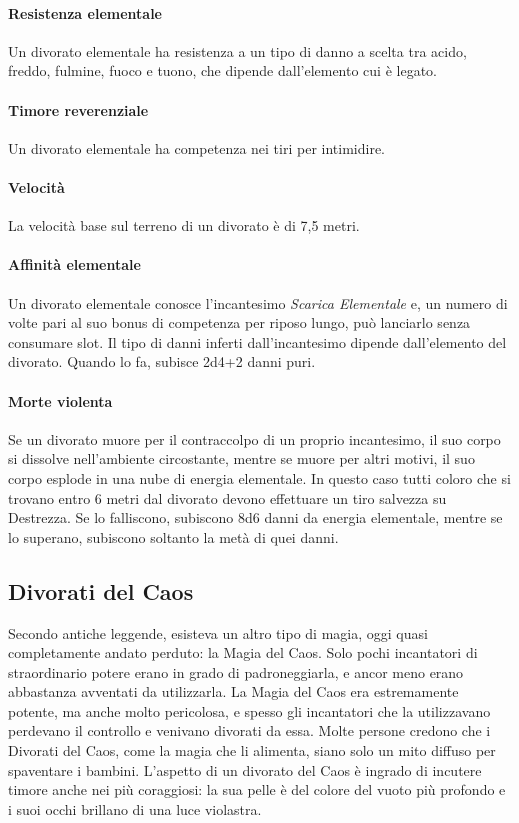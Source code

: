 \paragraph{Resistenza elementale} Un divorato elementale ha resistenza a un tipo di danno a scelta tra acido, freddo, fulmine, fuoco e tuono, che dipende dall'elemento cui è legato.
\paragraph{Timore reverenziale} Un divorato elementale ha competenza nei tiri per intimidire.
\paragraph{Velocità} La velocità base sul terreno di un divorato è di 7,5 metri.
\paragraph{Affinità elementale}Un divorato elementale conosce l'incantesimo \textit{Scarica Elementale} e, un numero di volte pari al suo bonus di competenza per riposo lungo, può lanciarlo senza consumare slot. Il tipo di danni inferti dall'incantesimo dipende dall'elemento del divorato. Quando lo fa, subisce 2d4+2 danni puri.
\paragraph{Morte violenta} Se un divorato muore per il contraccolpo di un proprio incantesimo, il suo corpo si dissolve nell'ambiente circostante, mentre se muore per altri motivi, il suo corpo esplode in una nube di energia elementale. In questo caso tutti coloro che si trovano entro 6 metri dal divorato devono effettuare un tiro salvezza su Destrezza. Se lo falliscono, subiscono 8d6 danni da energia elementale, mentre se lo superano, subiscono soltanto la metà di quei danni.

\subsection{Divorati del Caos}
Secondo antiche leggende, esisteva un altro tipo di magia, oggi quasi completamente andato perduto: la Magia del Caos. Solo pochi incantatori di straordinario potere erano in grado di padroneggiarla, e ancor meno erano abbastanza avventati da utilizzarla. La Magia del Caos era estremamente potente, ma anche molto pericolosa, e spesso gli incantatori che la utilizzavano perdevano il controllo e venivano divorati da essa. Molte persone credono che i Divorati del Caos, come la magia che li alimenta, siano solo un mito diffuso per spaventare i bambini. L'aspetto di un divorato del Caos è ingrado di incutere timore anche nei più coraggiosi: la sua pelle è del colore del vuoto più profondo e i suoi occhi brillano di una luce violastra.
